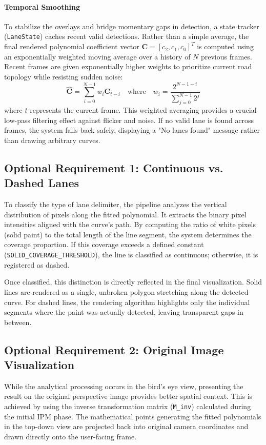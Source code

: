 \documentclass[12pt,a4paper]{article}
\begin{document}
\paragraph{Temporal Smoothing}
To stabilize the overlays and bridge momentary gaps in detection, a state tracker (\texttt{LaneState}) caches recent valid detections. Rather than a simple average, the final rendered polynomial coefficient vector $\mathbf{C} = [c_2, c_1, c_0]^T$ is computed using an exponentially weighted moving average over a history of $N$ previous frames. Recent frames are given exponentially higher weights to prioritize current road topology while resisting sudden noise:
\begin{equation}
    \hat{\mathbf{C}} = \sum_{i=0}^{N-1} w_{i} \mathbf{C}_{t-i} \quad \text{where} \quad w_i = \frac{2^{N-1-i}}{\sum_{j=0}^{N-1} 2^j}
\end{equation}
where $t$ represents the current frame. This weighted averaging provides a crucial low-pass filtering effect against flicker and noise. If no valid lane is found across frames, the system falls back safely, displaying a "No lanes found" message rather than drawing arbitrary curves.

\subsection{Optional Requirement 1: Continuous vs. Dashed Lanes}
To classify the type of lane delimiter, the pipeline analyzes the vertical distribution of pixels along the fitted polynomial. It extracts the binary pixel intensities aligned with the curve's path. By computing the ratio of white pixels (solid paint) to the total length of the line segment, the system determines the coverage proportion. If this coverage exceeds a defined constant (\texttt{SOLID\_COVERAGE\_THRESHOLD}), the line is classified as continuous; otherwise, it is registered as dashed. 

Once classified, this distinction is directly reflected in the final visualization. Solid lines are rendered as a single, unbroken polygon stretching along the detected curve. For dashed lines, the rendering algorithm highlights only the individual segments where the paint was actually detected, leaving transparent gaps in between.

\subsection{Optional Requirement 2: Original Image Visualization}
While the analytical processing occurs in the bird's eye view, presenting the result on the original perspective image provides better spatial context. This is achieved by using the inverse transformation matrix (\texttt{M\_inv}) calculated during the initial IPM phase. The mathematical points generating the fitted polynomials in the top-down view are projected back into original camera coordinates and drawn directly onto the user-facing frame.
\end{document}
